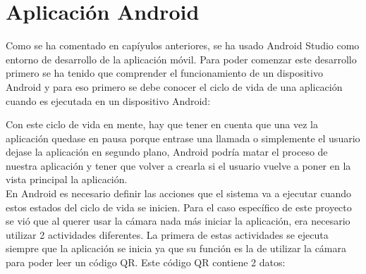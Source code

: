 \section{Aplicaci\'on Android}
\label{cap4:sec:Android}


Como se ha comentado en cap\'iyulos anteriores, se ha usado Android Studio como entorno de desarrollo de la aplicaci\'on m\'ovil. Para poder comenzar este desarrollo primero se ha tenido que comprender el funcionamiento de un dispositivo Android y para eso primero se debe conocer el ciclo de vida de una aplicaci\'on cuando es ejecutada en un dispositivo Android:

\begin{figure}[h]

\end{figure}

Con este ciclo de vida en mente, hay que tener en cuenta que una vez la aplicaci\'on quedase en pausa porque entrase una llamada o simplemente el usuario dejase la aplicaci\'on en segundo plano, Android podr\'ia matar el proceso de nuestra aplicaci\'on y tener que volver a crearla si el usuario vuelve a poner en la vista principal la aplicaci\'on.
\\
En Android es necesario definir las acciones que el sistema va a ejecutar cuando estos estados del ciclo de vida se inicien. Para el caso espec\'ifico de este proyecto se vi\'o que al querer usar la c\'amara nada m\'as iniciar la aplicaci\'on, era necesario utilizar 2 actividades diferentes. La primera de estas actividades se ejecuta siempre que la aplicaci\'on se inicia ya que su funci\'on es la de utilizar la c\'amara para poder leer un c\'odigo QR. Este c\'odigo QR contiene 2 datos:

